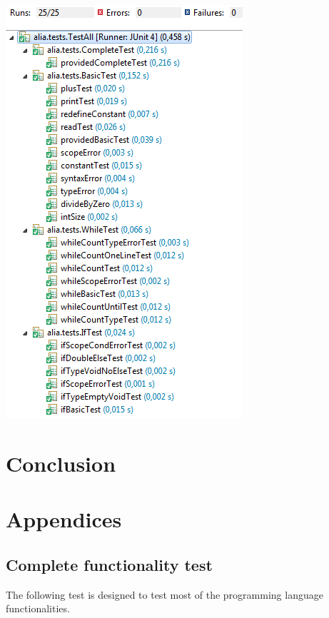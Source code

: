 \documentclass[paper=a4, fontsize=11pt]{article}
\numberwithin{equation}{section}		%
\numberwithin{figure}{section}			%
\numberwithin{table}{section}				%
\begin{document}
\begin{center}
\includegraphics[scale=0.5]{images/testresults.png}
\end{center}



\section{Conclusion}
\section{Appendices}


\subsection{Complete functionality test}
The following test is designed to test most of the programming language functionalities.
\end{document}
